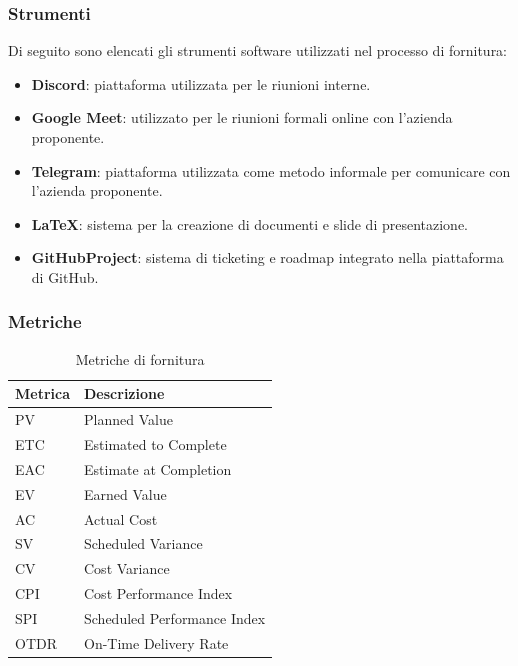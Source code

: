 \subsubsection{Strumenti}
Di seguito sono elencati gli strumenti software utilizzati nel processo di fornitura:
\begin{itemize}
    \item \textbf{Discord}: piattaforma utilizzata per le riunioni interne.
    \item \textbf{Google Meet}: utilizzato per le riunioni formali online con l'azienda proponente.
    \item \textbf{Telegram}: piattaforma utilizzata come metodo informale per comunicare con l'azienda proponente.
    \item \textbf{LaTeX}: sistema per la creazione di documenti e slide di presentazione.
    \item \textbf{GitHubProject}: sistema di ticketing e roadmap integrato nella piattaforma di GitHub. 
\end{itemize}

\subsubsection{Metriche}
\begin{table}[h!]
    \centering
    \renewcommand{\arraystretch}{1.5}
    \begin{tabular}{|>{\centering\arraybackslash}m{3cm}|>{\centering\arraybackslash}m{5cm}|}
        \hline
        \textbf{Metrica} & \textbf{Descrizione} \\
        \hline
        PV & Planned Value \\
        \hline
        ETC & Estimated to Complete \\
        \hline
        EAC & Estimate at Completion \\
        \hline
        EV  & Earned Value \\
        \hline
        AC  & Actual Cost \\
        \hline
        SV  & Scheduled Variance \\
        \hline
        CV  & Cost Variance \\
        \hline
        CPI & Cost Performance Index \\
        \hline
        SPI & Scheduled Performance Index \\
        \hline
        OTDR & On-Time Delivery Rate \\
        \hline
    \end{tabular}
    \caption{Metriche di fornitura}
    \label{tab:metriche}
\end{table}






